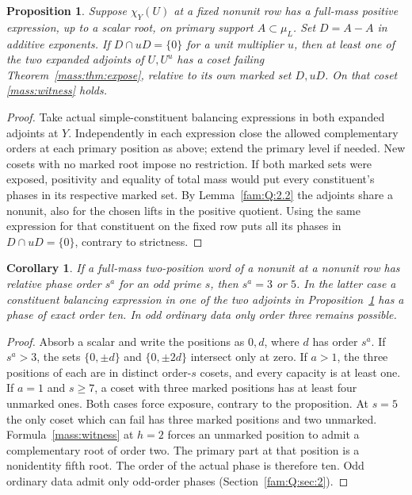 \documentclass[11pt,a4paper]{article}
\numberwithin{equation}{section}
\newtheorem{proposition}[theorem]{Proposition}
\newtheorem{corollary}[theorem]{Corollary}
\theoremstyle{remark}
\begin{document}
\begin{proposition}\label{mass:prop:transfer}
Suppose $\chi_Y(U)$ at a fixed nonunit row has a full-mass positive
expression, up to a scalar root, on primary support $A\subset\mu_L$.
Set $D=A-A$ in additive exponents. If $D\cap uD=\{0\}$ for a unit
multiplier $u$, then at least one of the two expanded adjoints of
$U,U^u$ has a coset failing Theorem~\ref{mass:thm:expose}, relative to
its own marked set $D,uD$. On that coset \eqref{mass:witness} holds.
\end{proposition}
\begin{proof}
Take actual simple-constituent balancing expressions in both expanded
adjoints at $Y$. Independently in each expression close the allowed
complementary orders at each primary position as above; extend the
primary level if needed. New cosets with no marked root impose no
restriction. If both marked sets were exposed, positivity and equality
of total mass would put every constituent's phases in its
respective marked set. By Lemma~\ref{fam:Q:2.2} the adjoints share a nonunit, also
for the chosen lifts in the positive quotient. Using the same expression
for that constituent on the fixed row puts all its phases in
$D\cap uD=\{0\}$, contrary to strictness.
\end{proof}

\begin{corollary}\label{mass:cor:two}
If a full-mass two-position word of a nonunit at a nonunit row has
relative phase order $s^a$ for an odd prime $s$, then $s^a=3$ or $5$.
In the latter case a constituent balancing expression in one of the
two adjoints in Proposition~\ref{mass:prop:transfer} has a phase of exact
order ten. In odd ordinary data only order three remains possible.
\end{corollary}
\begin{proof}
Absorb a scalar and write the positions as $0,d$, where $d$ has
order $s^a$. If $s^a>3$, the sets $\{0,\pm d\}$ and $\{0,\pm2d\}$
intersect only at zero. If $a>1$, the three positions of each are
in distinct order-$s$ cosets, and every capacity is at least one.
If $a=1$ and $s\ge7$, a coset with three marked positions has at least
four unmarked ones. Both cases force exposure, contrary to the
proposition. At $s=5$ the only coset which can fail has three marked
positions and two unmarked. Formula~\eqref{mass:witness} at $h=2$ forces an unmarked
position to admit a complementary root of order two. The primary part
at that position is a nonidentity fifth root. The order of the actual
phase is therefore ten. Odd ordinary data admit only odd-order phases
(Section~\ref{fam:Q:sec:2}).
\end{proof}
\end{document}
